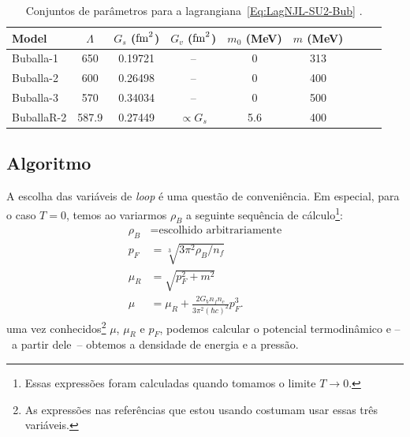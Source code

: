 \begin{table}
\begin{tabular}{lcccccccc}
\toprule
Model &  $\Lambda$ & $G_s$ ($\rm{fm}^2$) & $G_v$ ($\rm{fm}^2$) & $m_0$ (MeV) & $m$ (MeV) \\
\midrule
Buballa-1 & 650 & 0.19721 & -- & 0 & 313 \\
Buballa-2 & 600 & 0.26498 & -- & 0 & 400 \\
Buballa-3 & 570 & 0.34034 & -- & 0 & 500 \\
BuballaR-2 & 587.9 & 0.27449 & $\propto G_s$ & 5.6 & 400 \\
\bottomrule
\end{tabular}
\caption{Conjuntos de parâmetros para a lagrangiana~\eqref{Eq:LagNJL-SU2-Bub} \parencite{Buballa1996, Buballa}. \label{Tab:Parametros_NJL}}
\end{table}

\subsection{Algoritmo}

A escolha das variáveis de \emph{loop} é uma questão de conveniência. Em especial, para o caso $T = 0$, temos ao variarmos $\rho_B$ a seguinte sequência de cálculo\footnote{Essas expressões foram calculadas quando tomamos o limite $T \to 0$.}:
\begin{align}
	\rho_B &= \textrm{escolhido arbitrariamente} \\
	p_F &= \sqrt[3]{3 \pi^2 \rho_B / n_f} \label{Eq:mom_fermi_rho_bar}\\
	\mu_R &= \sqrt{p_F^2 + m^2} \label{Eq:pot_quim_renorm_loop_dens_bar}\\
	\mu &= \mu_R + \frac{2 G_V n_f n_c}{3\pi^2(\hbar c)^2} p_F^3.
\end{align}
%
uma vez conhecidos\footnote{As expressões nas referências que estou usando costumam usar essas três variáveis.} $\mu$, $\mu_R$ e $p_F$, podemos calcular o potencial termodinâmico e --~a partir dele~-- obtemos a densidade de energia e a pressão.

